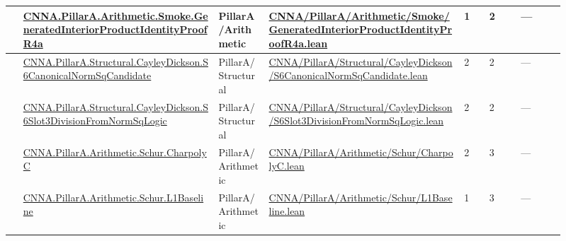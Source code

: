 \begin{longtable}{L{0.025\linewidth} L{0.315\linewidth} L{0.08\linewidth} L{0.315\linewidth} L{0.045\linewidth} L{0.055\linewidth} L{0.07\linewidth}}
\hline
{} & \href{run:repo_snapshot/CNNA/PillarA/Arithmetic/Smoke/GeneratedInteriorProductIdentityProofR4a.lean}{CNNA.\allowbreak{}PillarA.\allowbreak{}Arithmetic.\allowbreak{}Smoke.\allowbreak{}GeneratedInteriorProductIdentityProofR4a} & PillarA/\allowbreak{}Arithmetic & \href{run:repo_snapshot/CNNA/PillarA/Arithmetic/Smoke/GeneratedInteriorProductIdentityProofR4a.lean}{CNNA/\allowbreak{}PillarA/\allowbreak{}Arithmetic/\allowbreak{}Smoke/\allowbreak{}GeneratedInteriorProductIdentityProofR4a.\allowbreak{}lean} & 1 & 2 & ---\\
\hline
{} & \href{run:repo_snapshot/CNNA/PillarA/Structural/CayleyDickson/S6CanonicalNormSqCandidate.lean}{CNNA.\allowbreak{}PillarA.\allowbreak{}Structural.\allowbreak{}CayleyDickson.\allowbreak{}S6CanonicalNormSqCandidate} & PillarA/\allowbreak{}Structural & \href{run:repo_snapshot/CNNA/PillarA/Structural/CayleyDickson/S6CanonicalNormSqCandidate.lean}{CNNA/\allowbreak{}PillarA/\allowbreak{}Structural/\allowbreak{}CayleyDickson/\allowbreak{}S6CanonicalNormSqCandidate.\allowbreak{}lean} & 2 & 2 & ---\\
\hline
{} & \href{run:repo_snapshot/CNNA/PillarA/Structural/CayleyDickson/S6Slot3DivisionFromNormSqLogic.lean}{CNNA.\allowbreak{}PillarA.\allowbreak{}Structural.\allowbreak{}CayleyDickson.\allowbreak{}S6Slot3DivisionFromNormSqLogic} & PillarA/\allowbreak{}Structural & \href{run:repo_snapshot/CNNA/PillarA/Structural/CayleyDickson/S6Slot3DivisionFromNormSqLogic.lean}{CNNA/\allowbreak{}PillarA/\allowbreak{}Structural/\allowbreak{}CayleyDickson/\allowbreak{}S6Slot3DivisionFromNormSqLogic.\allowbreak{}lean} & 2 & 2 & ---\\
\hline
{} & \href{run:repo_snapshot/CNNA/PillarA/Arithmetic/Schur/CharpolyC.lean}{CNNA.\allowbreak{}PillarA.\allowbreak{}Arithmetic.\allowbreak{}Schur.\allowbreak{}CharpolyC} & PillarA/\allowbreak{}Arithmetic & \href{run:repo_snapshot/CNNA/PillarA/Arithmetic/Schur/CharpolyC.lean}{CNNA/\allowbreak{}PillarA/\allowbreak{}Arithmetic/\allowbreak{}Schur/\allowbreak{}CharpolyC.\allowbreak{}lean} & 2 & 3 & ---\\
\hline
{} & \href{run:repo_snapshot/CNNA/PillarA/Arithmetic/Schur/L1Baseline.lean}{CNNA.\allowbreak{}PillarA.\allowbreak{}Arithmetic.\allowbreak{}Schur.\allowbreak{}L1Baseline} & PillarA/\allowbreak{}Arithmetic & \href{run:repo_snapshot/CNNA/PillarA/Arithmetic/Schur/L1Baseline.lean}{CNNA/\allowbreak{}PillarA/\allowbreak{}Arithmetic/\allowbreak{}Schur/\allowbreak{}L1Baseline.\allowbreak{}lean} & 1 & 3 & ---\\

\end{longtable}
